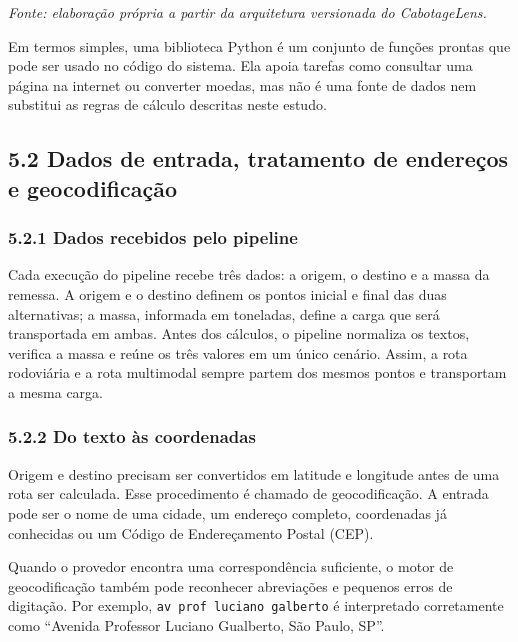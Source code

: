 \documentclass[brazil,]{article}
\let\oldsubsection\subsection
\renewcommand{\subsection}{\Needspace{12\baselineskip}\oldsubsection}
\let\oldsubsubsection\subsubsection
\renewcommand{\subsubsection}{\Needspace{10\baselineskip}\oldsubsubsection}
\begin{document}
\emph{Fonte: elaboração própria a partir da arquitetura versionada do
CabotageLens.}

Em termos simples, uma biblioteca Python é um conjunto de funções
prontas que pode ser usado no código do sistema. Ela apoia tarefas como
consultar uma página na internet ou converter moedas, mas não é uma
fonte de dados nem substitui as regras de cálculo descritas neste
estudo.

\hypertarget{dados-de-entrada-tratamento-de-endereuxe7os-e-geocodificauxe7uxe3o}{%
\subsection{5.2 Dados de entrada, tratamento de endereços e
geocodificação}\label{dados-de-entrada-tratamento-de-endereuxe7os-e-geocodificauxe7uxe3o}}

\hypertarget{dados-recebidos-pelo-pipeline}{%
\subsubsection{5.2.1 Dados recebidos pelo
pipeline}\label{dados-recebidos-pelo-pipeline}}

Cada execução do pipeline recebe três dados: a origem, o destino e a
massa da remessa. A origem e o destino definem os pontos inicial e final
das duas alternativas; a massa, informada em toneladas, define a carga
que será transportada em ambas. Antes dos cálculos, o pipeline normaliza
os textos, verifica a massa e reúne os três valores em um único cenário.
Assim, a rota rodoviária e a rota multimodal sempre partem dos mesmos
pontos e transportam a mesma carga.

\hypertarget{do-texto-uxe0s-coordenadas}{%
\subsubsection{5.2.2 Do texto às
coordenadas}\label{do-texto-uxe0s-coordenadas}}

Origem e destino precisam ser convertidos em latitude e longitude antes
de uma rota ser calculada. Esse procedimento é chamado de
geocodificação. A entrada pode ser o nome de uma cidade, um endereço
completo, coordenadas já conhecidas ou um Código de Endereçamento Postal
(CEP).

Quando o provedor encontra uma correspondência suficiente, o motor de
geocodificação também pode reconhecer abreviações e pequenos erros de
digitação. Por exemplo, \texttt{av\ prof\ luciano\ galberto} é
interpretado corretamente como ``Avenida Professor Luciano Gualberto,
São Paulo, SP''.
\end{document}
